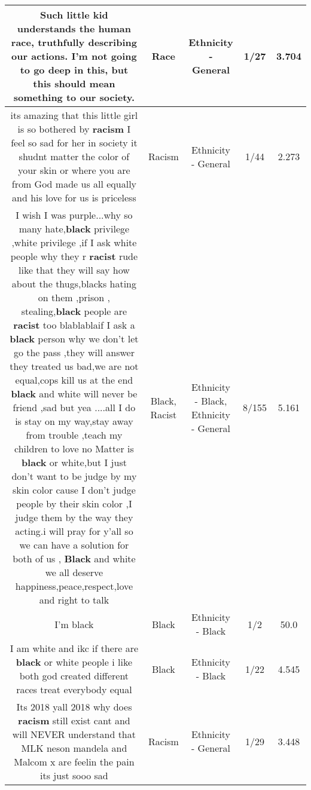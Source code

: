 \documentclass[11pt]{article}
\newlength\mylength
\begin{document}
\begin{center}
\begin{longtable}{|C{.65\mylength}|C{.30\mylength}|C{.12\mylength}|C{.12\mylength}|C{.12\mylength}|}
  \small Such little kid understands the human \textbf{race}, truthfully describing our actions. I'm not going to go deep in this, but this should mean something to our society.\normalsize   & Race & Ethnicity - General & 1/27 & 3.704 \\  \hline
  \small its amazing that this little girl is so bothered by \textbf{racism} I feel so sad for her in society it shudnt matter the color of your skin or where you are from God made us all equally and his love for us is priceless\normalsize   & Racism & Ethnicity - General & 1/44 & 2.273 \\  \hline
  \small I wish I was purple...why so many hate,\textbf{black} privilege ,white privilege ,if I ask white people why they r \textbf{racist} rude like that they will say how about the thugs,blacks hating on them ,prison , stealing,\textbf{black} people are \textbf{racist} too blablablaif I ask a \textbf{black} person why we don't let go the pass ,they will answer they treated us bad,we are not equal,cops kill us at the end \textbf{black} and white will never be friend ,sad but yea ....all I do is stay on my way,stay away from trouble ,teach my children to love no Matter is \textbf{black} or white,but I just don't want to be judge by my skin color cause I don't judge people by their skin color ,I judge them by the way they acting.i will pray for y'all so we can have a solution for both of us , \textbf{Black} and white we all deserve happiness,peace,respect,love and right to talk\normalsize   & Black, Racist & Ethnicity - Black, Ethnicity - General & 8/155 & 5.161 \\  \hline
  \small I'm black\normalsize   & Black & Ethnicity - Black & 1/2 & 50.0 \\  \hline
  \small I am white and ikc if there are \textbf{black} or white people i like both god created different races treat everybody equal\normalsize   & Black & Ethnicity - Black & 1/22 & 4.545 \\  \hline
  \small Its 2018 yall 2018 why does \textbf{racism} still exist cant and will NEVER understand that MLK neson mandela and Malcom x are feelin the pain  its just sooo sad\normalsize   & Racism & Ethnicity - General & 1/29 & 3.448 \\  \hline

\end{longtable}
\end{center}
\end{document}
